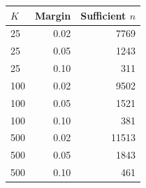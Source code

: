 \begin{tabular}{lrr}
\toprule
$K$ & Margin & Sufficient $n$ \\
\midrule
25 & 0.02 & 7769 \\
25 & 0.05 & 1243 \\
25 & 0.10 & 311 \\
100 & 0.02 & 9502 \\
100 & 0.05 & 1521 \\
100 & 0.10 & 381 \\
500 & 0.02 & 11513 \\
500 & 0.05 & 1843 \\
500 & 0.10 & 461 \\
\bottomrule
\end{tabular}
